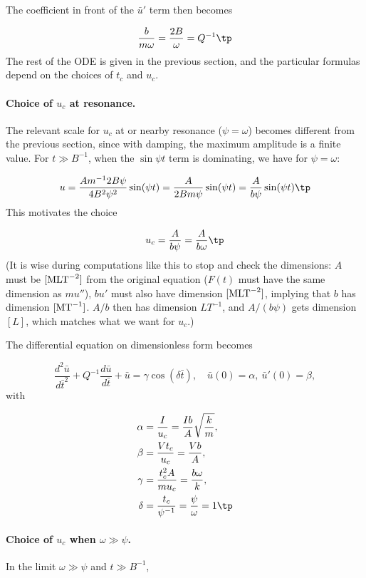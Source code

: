 \documentclass[graybox,envcountchap,sectrefs,final]{svmonodo}
\begin{document}
The coefficient in front of the $\bar u'$ term then becomes

\[ \frac{b}{m\omega} = \frac{2B}{\omega} = Q^{-1}\tp\]
The rest of the ODE is given in the previous section, and the particular
formulas depend on the choices of $t_c$ and $u_c$.

\paragraph{Choice of $u_c$ at resonance.}
The relevant scale for $u_c$ at or nearby resonance ($\psi = \omega$)
becomes different from the previous section, since with damping,
the maximum amplitude is a finite value. For $t\gg B^{-1}$, when the
$\sin\psi t$ term is dominating, we have for $\psi = \omega$:

\[ u = \frac{Am^{-1}2B\psi}{4B^2\psi^2}\sin (\psi t) =
\frac{A}{2Bm\psi}\sin (\psi t) =
\frac{A}{b\psi}\sin (\psi t)
\tp
\]
This motivates the choice

\[ u_c = \frac{A}{b\psi} = \frac{A}{b\omega}\tp\]
(It is wise during computations like this to stop and check the
dimensions: $A$ must be $[\hbox{MLT}^{-2}]$ from the original
equation ($F(t)$ must have the same dimension as $mu''$),
$bu'$ must also have dimension $[\hbox{MLT}^{-2}]$, implying that
$b$ has dimension $[\hbox{MT}^{-1}]$. $A/b$ then has dimension
$LT^{-1}$, and $A/(b\psi)$ gets dimension $[L]$, which matches
what we want for $u_c$.)

The differential equation on dimensionless form becomes

\begin{equation}
\frac{d^2\bar u}{d\bar t^2} + Q^{-1}\frac{d\bar u}{d\bar t} + \bar u =
\gamma
\cos(\delta\bar t),
\quad \bar u(0)=\alpha,\ \bar u'(0)=\beta,
\label{sec:scale:vib:damped:F:model:scaled1}
\end{equation}
with


\begin{align}
\alpha &= \frac{I}{u_c} = \frac{Ib}{A}\sqrt{\frac{k}{m}},\\ 
\beta  &= \frac{Vt_c}{u_c} = \frac{Vb}{A},\\ 
\gamma &= \frac{t_c^2 A}{mu_c} = \frac{b\omega}{k},\\ 
\delta &= \frac{t_c}{\psi^{-1}} = \frac{\psi}{\omega} = 1\tp
\end{align}

\paragraph{Choice of $u_c$ when $\omega\gg\psi$.}
In the limit $\omega\gg\psi$ and $t\gg B^{-1}$,
\end{document}
